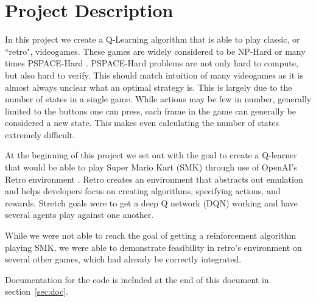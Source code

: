 \section{Project Description}
In this project we create a Q-Learning algorithm that is able to play classic,
or ``retro", videogames. These games are widely considered to be NP-Hard or
many times PSPACE-Hard \cite{DBLP}. PSPACE-Hard problems are not only hard to
compute, but also hard to verify. This should match intuition of many videogames
as it is almost always unclear what an optimal strategy is. This is largely due
to the number of states in a single game. While actions may be few in number,
generally limited to the buttons one can press, each frame in the game can 
generally be considered a new state. This makes even calculating the number
of states extremely difficult. 

At the beginning of this project we set out with the goal to create a Q-learner
that would be able to play Super Mario Kart (SMK) \cite{SMK} through use of 
OpenAI's Retro environment \cite{retro}. Retro creates an environment that 
abstracts out emulation and helps developers focus on creating algorithms,
specifying actions, and rewards. Stretch goals were to get a deep Q network 
(DQN) working and have several agents play against one another.

While we were not able to reach the goal of getting a reinforcement algorithm
playing SMK, we were able to demonstrate feasibility in retro's environment on
several other games, which had already be correctly integrated.

Documentation for the code is included at the end of this document in 
section~\ref{sec:doc}.

